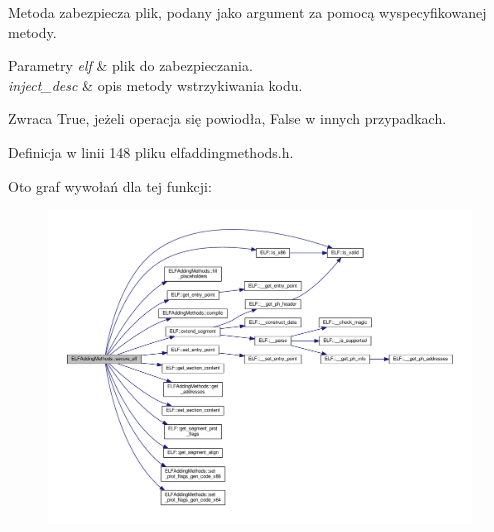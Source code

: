 Metoda zabezpiecza plik, podany jako argument za pomocą wyspecyfikowanej metody. 


\begin{DoxyParams}{Parametry}
{\em elf} & plik do zabezpieczania. \\
\hline
{\em inject\-\_\-desc} & opis metody wstrzykiwania kodu. \\
\hline
\end{DoxyParams}
\begin{DoxyReturn}{Zwraca}
True, jeżeli operacja się powiodła, False w innych przypadkach. 
\end{DoxyReturn}


Definicja w linii 148 pliku elfaddingmethods.\-h.



Oto graf wywołań dla tej funkcji\-:
\nopagebreak
\begin{figure}[H]
\begin{center}
\leavevmode
\includegraphics[width=350pt]{class_e_l_f_adding_methods_acaa41aa5ab101bb4fa0e23a3029020ad_cgraph}
\end{center}
\end{figure}


